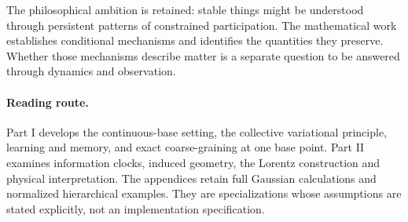 The philosophical ambition is retained: stable things might be understood through persistent patterns of constrained participation. The mathematical work establishes conditional mechanisms and identifies the quantities they preserve. Whether those mechanisms describe matter is a separate question to be answered through dynamics and observation.

\paragraph{Reading route.}
Part I develops the continuous-base setting, the collective variational principle, learning and memory, and exact coarse-graining at one base point. Part II examines information clocks, induced geometry, the Lorentz construction and physical interpretation. The appendices retain full Gaussian calculations and normalized hierarchical examples. They are specializations whose assumptions are stated explicitly, not an implementation specification.

